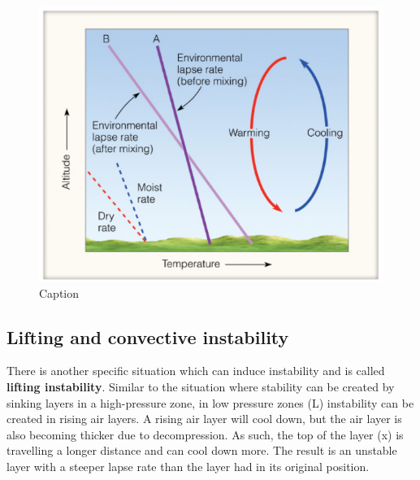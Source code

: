 \documentclass[12pt,oneside]{book}
\begin{document}
\begin{figure}

{\centering \includegraphics[width=1\linewidth]{figures/Figure313} 

}

\caption{Caption}\label{fig:Mixing}
\end{figure}

\subsection{Lifting and convective
instability}\label{lifting-and-convective-instability}

There is another specific situation which can induce instability and is
called \textbf{lifting instability}. Similar to the situation where
stability can be created by sinking layers in a high-pressure zone, in
low pressure zones (L) instability can be created in rising air layers.
A rising air layer will cool down, but the air layer is also becoming
thicker due to decompression. As such, the top of the layer (x) is
travelling a longer distance and can cool down more. The result is an
unstable layer with a steeper lapse rate than the layer had in its
original position.
\end{document}
